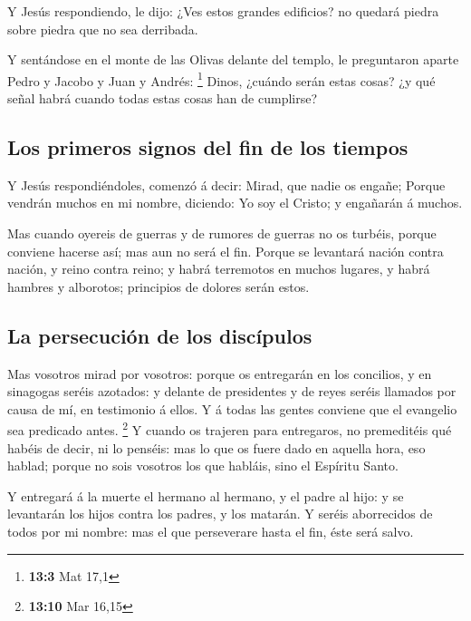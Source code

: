  Y Jesús respondiendo, le dijo: ¿Ves estos grandes
edificios? no quedará piedra sobre piedra que no sea derribada.

 Y sentándose en el monte de las Olivas delante del
templo, le preguntaron aparte Pedro y Jacobo y Juan y Andrés:
\footnote{\textbf{13:3} Mat 17,1}  Dinos, ¿cuándo serán
estas cosas? ¿y qué señal habrá cuando todas estas cosas han de
cumplirse?

\hypertarget{los-primeros-signos-del-fin-de-los-tiempos-1}{%
\subsection{Los primeros signos del fin de los
tiempos}\label{los-primeros-signos-del-fin-de-los-tiempos-1}}

 Y Jesús respondiéndoles, comenzó á decir: Mirad, que
nadie os engañe;  Porque vendrán muchos en mi nombre,
diciendo: Yo soy el Cristo; y engañarán á muchos.

 Mas cuando oyereis de guerras y de rumores de guerras no
os turbéis, porque conviene hacerse así; mas aun no será el fin.
 Porque se levantará nación contra nación, y reino contra
reino; y habrá terremotos en muchos lugares, y habrá hambres y
alborotos; principios de dolores serán estos.

\hypertarget{la-persecuciuxf3n-de-los-discuxedpulos}{%
\subsection{La persecución de los
discípulos}\label{la-persecuciuxf3n-de-los-discuxedpulos}}

 Mas vosotros mirad por vosotros: porque os entregarán en
los concilios, y en sinagogas seréis azotados: y delante de presidentes
y de reyes seréis llamados por causa de mí, en testimonio á ellos.
 Y á todas las gentes conviene que el evangelio sea
predicado antes. \footnote{\textbf{13:10} Mar 16,15}  Y
cuando os trajeren para entregaros, no premeditéis qué habéis de decir,
ni lo penséis: mas lo que os fuere dado en aquella hora, eso hablad;
porque no sois vosotros los que habláis, sino el Espíritu Santo.

 Y entregará á la muerte el hermano al hermano, y el
padre al hijo: y se levantarán los hijos contra los padres, y los
matarán.  Y seréis aborrecidos de todos por mi nombre:
mas el que perseverare hasta el fin, éste será salvo.


